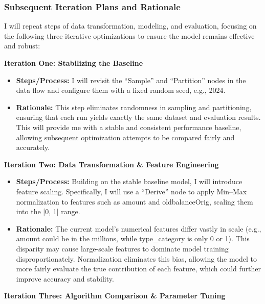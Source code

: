 \documentclass[sigplan,screen]{acmart}
\begin{document}
\subsubsection{Subsequent Iteration Plans and Rationale}

I will repeat steps of data transformation, modeling, and evaluation, focusing on the following three iterative optimizations to ensure the model remains effective and robust:

\textbf{Iteration One: Stabilizing the Baseline}

\begin{itemize}
    \item \textbf{Steps/Process:} I will revisit the ``Sample'' and ``Partition'' nodes in the data flow and configure them with a fixed random seed, e.g., 2024.
    \item \textbf{Rationale:} This step eliminates randomness in sampling and partitioning, ensuring that each run yields exactly the same dataset and evaluation results. This will provide me with a stable and consistent performance baseline, allowing subsequent optimization attempts to be compared fairly and accurately.
\end{itemize}

\textbf{Iteration Two: Data Transformation \& Feature Engineering}

\begin{itemize}
    \item \textbf{Steps/Process:} Building on the stable baseline model, I will introduce feature scaling. Specifically, I will use a ``Derive'' node to apply Min--Max normalization to features such as amount and oldbalanceOrig, scaling them into the [0, 1] range.
    \item \textbf{Rationale:} The current model's numerical features differ vastly in scale (e.g., amount could be in the millions, while type\_category is only 0 or 1). This disparity may cause large-scale features to dominate model training disproportionately. Normalization eliminates this bias, allowing the model to more fairly evaluate the true contribution of each feature, which could further improve accuracy and stability.
\end{itemize}

\textbf{Iteration Three: Algorithm Comparison \& Parameter Tuning}
\end{document}
